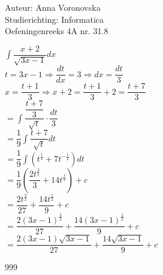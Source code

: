 \documentclass[a4paper]{article}
\begin{document}
  
\noindent \large Auteur: Anna Voronovska \\
\noindent \large Studierichting: Informatica\\
\noindent \large Oefeningenreeks 4A nr. 31.8\\

\medskip

\normalsize

$\displaystyle\int \dfrac{x+2}{\sqrt{3x-1}}dx $\\

$t = 3x-1 \Rightarrow \dfrac{dt}{dx} = 3 \Rightarrow dx = \dfrac{dt}{3}$\\

$x = \dfrac{t+1}{3} \Rightarrow x + 2 = \dfrac{t+1}{3} + 2 = \dfrac{t+7}{3}$\\

$= \displaystyle\int \dfrac{\dfrac{t+7}{3}}{\sqrt{t}} \cdot \dfrac{dt}{3}$\\

$= \dfrac{1}{9}\displaystyle\int \dfrac{t+7}{\sqrt{t}}dt$\\

$= \dfrac{1}{9}\displaystyle\int \left( t^{\tfrac{1}{2}} + 7t^{-\tfrac{1}{2}} \right)dt$\\

$= \dfrac{1}{9}\left( \dfrac{2t^{\tfrac{3}{2}}}{3} + 14t^{\tfrac{1}{2}} \right) + c$\\

$= \dfrac{2t^{\tfrac{3}{2}}}{27} + \dfrac{14t^{\tfrac{1}{2}}}{9} + c$\\

$= \dfrac{2(3x-1)^{\tfrac{3}{2}}}{27} + \dfrac{14(3x-1)^{\tfrac{1}{2}}}{9} + c$\\

$= \dfrac{2(3x-1)\sqrt{3x-1}}{27} + \dfrac{14\sqrt{3x-1}}{9} + c$\\

\begin{thebibliography}{999}
\end{thebibliography}
\end{document}
